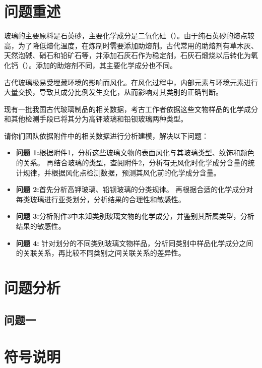 
\section{问题重述}

玻璃的主要原料是石英砂，主要化学成分是二氧化硅（）。由于纯石英砂的熔点较高，为了降低熔化温度，在炼制时需要添加助熔剂。古代常用的助熔剂有草木灰、天然泡碱、硝石和铅矿石等，并添加石灰石作为稳定剂，石灰石煅烧以后转化为氧化钙（）。添加的助熔剂不同，其主要化学成分也不同。

古代玻璃极易受埋藏环境的影响而风化。在风化过程中，内部元素与环境元素进行大量交换，导致其成分比例发生变化，从而影响对其类别的正确判断。

现有一批我国古代玻璃制品的相关数据，考古工作者依据这些文物样品的化学成分和其他检测手段已将其分为高钾玻璃和铅钡玻璃两种类型。

请你们团队依据附件中的相关数据进行分析建模，解决以下问题：

\begin{itemize}

\item \textbf{问题 1:}根据附件1，分析这些玻璃文物的表面风化与其玻璃类型、纹饰和颜色的关系。
再结合玻璃的类型，查阅附件2，分析有无风化时化学成分含量的统计规律，并根据风化点检测数据，预测其风化前的化学成分含量。

\item \textbf{问题 2:}首先分析高钾玻璃、铅钡玻璃的分类规律。
再根据合适的化学成分对每类玻璃进行亚类划分，分析结果的合理性和敏感性。

\item \textbf{问题 3:}分析附件3中未知类别玻璃文物的化学成分，并鉴别其所属类型，分析结果的敏感性。

\item \textbf{问题 4: }针对划分的不同类别玻璃文物样品，分析同类别中样品化学成分之间的关联关系，再比较不同类别之间关联关系的差异性。

\end{itemize}


\section{问题分析} %
\label{sec:问题分析}

\subsection{问题一} %
\label{sub:问题一}








\section{符号说明} %
\label{sec:符号说明}

